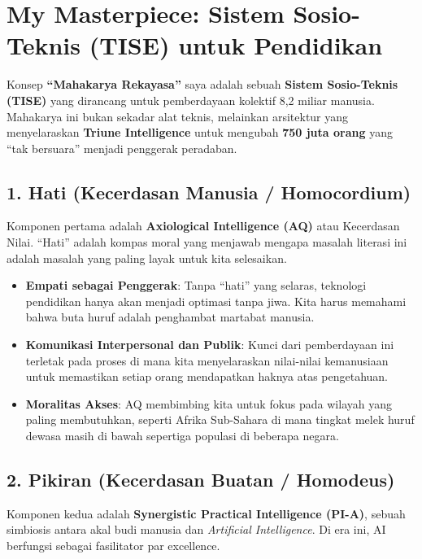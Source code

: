 \documentclass[
  letterpaper,
  DIV=11,
  numbers=noendperiod]{scrreprt}
\providecommand{\tightlist}{%
  \setlength{\itemsep}{0pt}\setlength{\parskip}{0pt}}
\begin{document}
\section{My Masterpiece: Sistem Sosio-Teknis (TISE) untuk
Pendidikan}\label{my-masterpiece-sistem-sosio-teknis-tise-untuk-pendidikan}

Konsep \textbf{``Mahakarya Rekayasa''} saya adalah sebuah \textbf{Sistem
Sosio-Teknis (TISE)} yang dirancang untuk pemberdayaan kolektif 8,2
miliar manusia. Mahakarya ini bukan sekadar alat teknis, melainkan
arsitektur yang menyelaraskan \textbf{Triune Intelligence} untuk
mengubah \textbf{750 juta orang} yang ``tak bersuara'' menjadi penggerak
peradaban.

\subsection{1. Hati (Kecerdasan Manusia /
Homocordium)}\label{hati-kecerdasan-manusia-homocordium}

Komponen pertama adalah \textbf{Axiological Intelligence (AQ)} atau
Kecerdasan Nilai. ``Hati'' adalah kompas moral yang menjawab mengapa
masalah literasi ini adalah masalah yang paling layak untuk kita
selesaikan.

\begin{itemize}
\tightlist
\item
  \textbf{Empati sebagai Penggerak}: Tanpa ``hati'' yang selaras,
  teknologi pendidikan hanya akan menjadi optimasi tanpa jiwa. Kita
  harus memahami bahwa buta huruf adalah penghambat martabat manusia.
\item
  \textbf{Komunikasi Interpersonal dan Publik}: Kunci dari pemberdayaan
  ini terletak pada proses di mana kita menyelaraskan nilai-nilai
  kemanusiaan untuk memastikan setiap orang mendapatkan haknya atas
  pengetahuan.
\item
  \textbf{Moralitas Akses}: AQ membimbing kita untuk fokus pada wilayah
  yang paling membutuhkan, seperti Afrika Sub-Sahara di mana tingkat
  melek huruf dewasa masih di bawah sepertiga populasi di beberapa
  negara.
\end{itemize}

\subsection{2. Pikiran (Kecerdasan Buatan /
Homodeus)}\label{pikiran-kecerdasan-buatan-homodeus}

Komponen kedua adalah \textbf{Synergistic Practical Intelligence
(PI-A)}, sebuah simbiosis antara akal budi manusia dan \emph{Artificial
Intelligence}. Di era ini, AI berfungsi sebagai fasilitator par
excellence.
\end{document}
